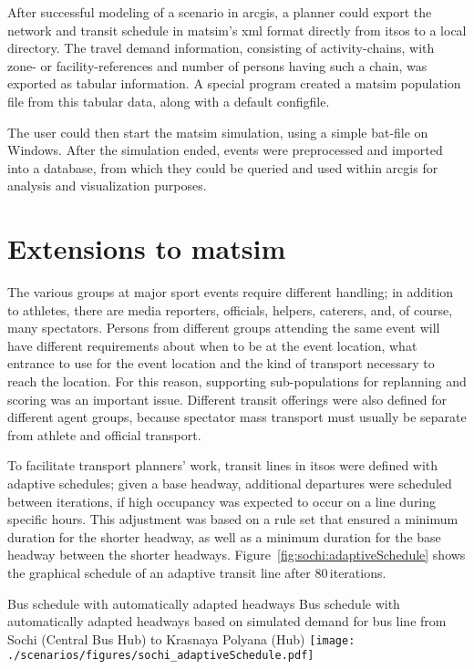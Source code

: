 After successful modeling of a scenario in \gls{arcgis}, a planner could export
the network and transit schedule in \gls{matsim}'s \gls{xml} format directly from \gls{itsos} to a
local directory. The travel demand information, consisting of activity-chains,
with zone- or facility-references and number of persons having such a
chain, was exported as tabular information. A special program created a \gls{matsim}
population file from this tabular data, along with a default \gls{configfile}.

The user could then start the \gls{matsim} simulation, using a simple bat-file
on Windows. After the simulation ended,  events were preprocessed and
imported into a database, from which they could be queried and used within \gls{arcgis}
for analysis and visualization purposes.

\section{Extensions to \protect\gls{matsim}}
The various groups at major sport events require different handling;
in addition to athletes, there are media reporters, officials,
helpers, caterers, and, of course, many spectators. Persons from different
groups attending the same event will have different requirements about when
to be at the event location, what entrance to use for the event
location and the kind of transport necessary to reach the location. For this reason,
supporting sub-populations for \gls{replanning} and scoring was an important issue.
Different transit offerings were also defined for different agent groups,
because spectator mass transport must usually be separate from
athlete and official transport.

To facilitate transport planners' work, transit lines in
\gls{itsos} were defined with adaptive schedules; given a base headway,
additional departures were scheduled between iterations, if high
occupancy was expected to occur on a line during specific hours. This adjustment was based
on a rule set that ensured a minimum duration for the shorter headway, as well
as a minimum duration for the base headway between the shorter headways.
Figure~\ref{fig:sochi:adaptiveSchedule} shows the graphical schedule of an
adaptive transit line after 80\,iterations.

\createfigure%
{Bus schedule with automatically adapted headways}%
{Bus schedule with automatically adapted headways based on simulated demand for
bus line from Sochi (Central Bus Hub) to Krasnaya Polyana (Hub)}%
{\label{fig:sochi:adaptiveSchedule}}%
{\texttt{[image: ./scenarios/figures/sochi\_adaptiveSchedule.pdf]}}%
{}

